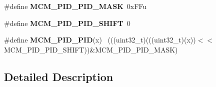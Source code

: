 \begin{DoxyCompactItemize}
\item 
\hypertarget{group___m_c_m___register___masks_ga258efdcb0108c5e954d399d9a6e8883a}{}\#define {\bfseries M\+C\+M\+\_\+\+P\+I\+D\+\_\+\+P\+I\+D\+\_\+\+M\+A\+S\+K}~0x\+F\+Fu\label{group___m_c_m___register___masks_ga258efdcb0108c5e954d399d9a6e8883a}

\item 
\hypertarget{group___m_c_m___register___masks_ga579f075ec9afb3010ecf64eea087a04a}{}\#define {\bfseries M\+C\+M\+\_\+\+P\+I\+D\+\_\+\+P\+I\+D\+\_\+\+S\+H\+I\+F\+T}~0\label{group___m_c_m___register___masks_ga579f075ec9afb3010ecf64eea087a04a}

\item 
\hypertarget{group___m_c_m___register___masks_gae36e94730116067564a57fe35947e646}{}\#define {\bfseries M\+C\+M\+\_\+\+P\+I\+D\+\_\+\+P\+I\+D}(x)                                                  ~(((uint32\+\_\+t)(((uint32\+\_\+t)(x))$<$$<$M\+C\+M\+\_\+\+P\+I\+D\+\_\+\+P\+I\+D\+\_\+\+S\+H\+I\+F\+T))\&M\+C\+M\+\_\+\+P\+I\+D\+\_\+\+P\+I\+D\+\_\+\+M\+A\+S\+K)\label{group___m_c_m___register___masks_gae36e94730116067564a57fe35947e646}

\end{DoxyCompactItemize}


\subsection{Detailed Description}
